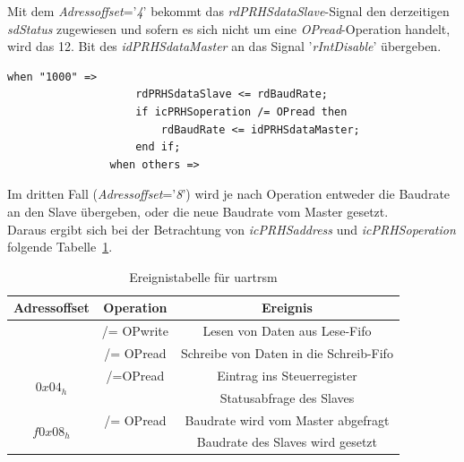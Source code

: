 Mit dem \emph{Adressoffset}='\emph{4}' bekommt das \emph{rdPRHSdataSlave}-Signal den derzeitigen \emph{sdStatus} zugewiesen
und sofern es sich nicht um eine \emph{OPread}-Operation handelt, wird das 12. Bit des \emph{idPRHSdataMaster}
an das Signal '\emph{rIntDisable}' übergeben.\\

\begin{lstlisting}[caption={Basisadresse + \emph{Adressoffset}='\emph{8}' },label={code:offset8}]
                when "1000" =>
                    rdPRHSdataSlave <= rdBaudRate;
                    if icPRHSoperation /= OPread then
                        rdBaudRate <= idPRHSdataMaster;
                    end if;
                when others =>
 \end{lstlisting}

\newpage

Im dritten Fall (\emph{Adressoffset}='\emph{8}') wird je nach Operation entweder die Baudrate an den Slave übergeben,
oder die neue Baudrate vom Master gesetzt. \\


Daraus ergibt sich bei der Betrachtung von \emph{icPRHSaddress} und \emph{icPRHSoperation} folgende Tabelle~\ref{tab:ereignisse}.

\begin{table}[h]
\centering
\begin{tabular}{c|c|c}
\toprule
\multicolumn{1}{c|}{\textbf{Adressoffset}} & \multicolumn{1}{c|}{\textbf{Operation}} & \multicolumn{1}{c}{\textbf{Ereignis}} \\
\midrule
\centering
\multirow{2}{*}{$0x00_{h}$}
   & /= OPwrite & Lesen von Daten aus Lese-Fifo\\
  \cline{2-3}
   & /= OPread &  Schreibe von Daten in die Schreib-Fifo\\
\hline
\multirow{2}{*}{$0x04_{h}$}
            & /=OPread & Eintrag ins Steuerregister\\
  \cline{2-3}
            & & Statusabfrage des Slaves\\
\hline
  \multirow{2}{*}{$f0x08_{h}$}
            & /= OPread & Baudrate wird vom Master abgefragt\\
    \cline{2-3}
            & & Baudrate des Slaves wird gesetzt\\
\bottomrule
\end{tabular}
\caption{Ereignistabelle für \ac{uart}rsm}
\label{tab:ereignisse}
\end{table}





